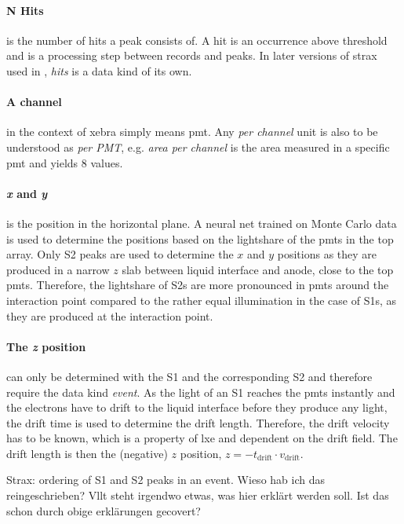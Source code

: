 \paragraph{N Hits} is the number of hits a peak consists of.
A hit is an occurrence above threshold and is a processing step between records and peaks.
In later versions of strax used in \nton, \emph{hits} is a data kind of its own.

\paragraph{A channel} in the context of \gls{xebra} simply means \gls{pmt}.
Any \emph{per channel} unit is also to be understood as \emph{per PMT}, e.g. \emph{area per channel} is the area measured in a specific \gls{pmt} and yields 8 values.

\paragraph{\emph{x} and \emph{y}} is the position in the horizontal plane.
A neural net trained on Monte Carlo data is used to determine the positions based on the lightshare of the \glspl{pmt} in the top array.  %
Only S2 peaks are used to determine the $ x $ and $ y $ positions as they are produced in a narrow $ z $ slab between liquid interface and anode, close to the top \glspl{pmt}.
Therefore, the lightshare of S2s are more pronounced in \glspl{pmt} around the interaction point compared to the rather equal illumination in the case of S1s, as they are produced at the interaction point.


\paragraph{The \emph{z} position} can only be determined with the S1 and the corresponding S2 and therefore require the data kind \emph{event}.
As the light of an S1 reaches the \glspl{pmt} instantly and the electrons have to drift to the liquid interface before they produce any light, the drift time is used to determine the drift length.
Therefore, the drift velocity has to be known, which is a property of \gls{lxe} and dependent on the drift field.
The drift length is then the (negative) $ z $ position, $ z = -t_\mathrm{drift} \cdot v_\mathrm{drift} $.





Strax: ordering of S1 and S2 peaks in an event. Wieso hab ich das reingeschrieben? Vllt steht irgendwo etwas, was hier erklärt werden soll. Ist das schon durch obige erklärungen gecovert?
